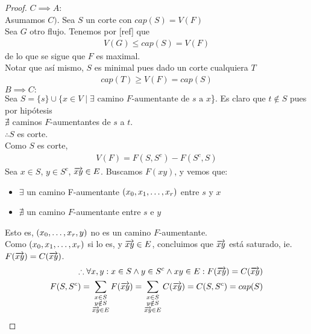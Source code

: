 \begin{proof}
  $C \implies A:$\\
  Asumamos $C)$. Sea $S$ un corte con $cap(S) = V(F)$\\
  Sea $G$ otro flujo. Tenemos por [ref] que
  \begin{align} V(G) \le cap(S) = V(F) \end{align}
  de lo que se sigue que $F$ es maximal.\\
  
  Notar que así mismo, $S$ es minimal pues dado un corte cualquiera $T$\begin{align}
    cap(T) \ge V(F) = cap(S)
  \end{align}
  $B \implies C:$\\
  Sea $S = \{s\} \cup \{x \in V \mid \exists \text{ camino $F$-aumentante de $s$ a $x$}$\}.
  Es claro que $t \notin S$ pues por hipótesis \\$\nexists$ caminos $F$-aumentantes de $s$ a $t$.\\
  $\therefore S$ es corte.\\
  Como $S$ es corte,
  \begin{align}
    V(F) = F(S, S^c) - F(S^c, S)
  \end{align}
  Sea $x \in S$, $y \in S^c$, $\overrightarrow{xy} \in E$. Buscamos $F(xy)$, y vemos que:
  \begin{itemize}
  \item $\exists$ un camino F-aumentante $(x_0, x_1,\mathellipsis, x_r)$ entre $s$ y $x$
  \item $\nexists$ un camino $F$-aumentante entre $s$ e $y$
  \end{itemize}
  Esto es, $(x_0, \mathellipsis, x_r, y)$ no es un camino $F$-aumentante.\\
  Como $(x_0, x_1, \mathellipsis, x_r)$ si lo es, y $\overrightarrow{xy} \in E$, concluimos que $\overrightarrow{xy}$ está saturado, ie. \\$F(\overrightarrow{xy}) = C(\overrightarrow{xy})$.
  \begin{align}
    \therefore \forall x,y: x \in S \wedge y \in S^c \wedge xy \in E : F(\overrightarrow{xy}) = C(\overrightarrow{xy})\\
    F(S, S^c) = \sum_{\substack{x\in S\\ y \notin S \\\overrightarrow{xy} \in E}} F(\overrightarrow{xy}) = \sum_{\substack{x\in S\\ y \notin S\\ \overrightarrow{xy} \in E}} C(\overrightarrow{xy}) = C(S, S^c) = cap(S)\\
  \end{align}

\end{proof}

